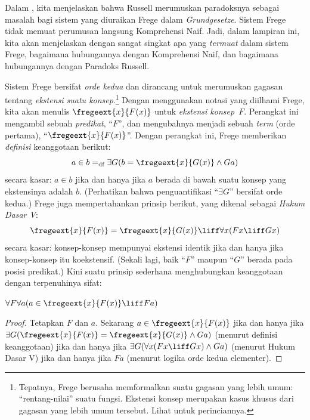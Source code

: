 \documentclass[../../../include/open-logic-section]{subfiles}
\begin{document}


Dalam , kita menjelaskan bahwa Russell merumuskan
paradoksnya sebagai masalah bagi sistem yang diuraikan Frege dalam
\emph{Grundgesetze}. Sistem Frege tidak memuat perumusan langsung Komprehensi
Naif. Jadi, dalam lampiran ini, kita akan menjelaskan dengan sangat singkat
apa yang \emph{termuat} dalam sistem Frege, bagaimana hubungannya dengan
Komprehensi Naif, dan bagaimana hubungannya dengan Paradoks Russell.

Sistem Frege bersifat \emph{orde kedua} dan dirancang untuk merumuskan
gagasan tentang \emph{ekstensi suatu konsep}.\footnote{Tepatnya, Frege
berusaha memformalkan suatu gagasan yang lebih umum: ``rentang-nilai'' suatu
fungsi. Ekstensi konsep merupakan kasus khusus dari gagasan yang lebih umum
tersebut. Lihat \citet[pp.\ 8--9]{Heck2012} untuk perinciannya.} Dengan
menggunakan notasi yang diilhami Frege, kita akan menulis
$\fregeext{x}{F(x)}$ untuk \emph{ekstensi konsep~$F$}. Perangkat ini mengambil
sebuah \emph{predikat}, ``$F$'', dan mengubahnya menjadi sebuah
\emph{term} (orde pertama), ``$\fregeext{x}{F(x)}$''. Dengan perangkat ini,
Frege memberikan \emph{definisi} keanggotaan berikut:
\[
	a \in b =_\text{df} \exists G(b = \fregeext{x}{G(x)} \land Ga)
\]
secara kasar: $a \in b$ jika dan hanya jika $a$ berada di bawah suatu konsep
yang ekstensinya adalah $b$. (Perhatikan bahwa penguantifikasi ``$\exists G$'' bersifat orde
kedua.) Frege juga mempertahankan prinsip berikut, yang dikenal sebagai
\emph{Hukum Dasar V}:
$$\fregeext{x}{F(x)} = \fregeext{x}{G(x)} \liff \forall x (Fx \liff Gx)$$
secara kasar: konsep-konsep mempunyai ekstensi identik jika dan hanya jika
konsep-konsep itu koekstensif. (Sekali lagi, baik ``$F$'' maupun ``$G$'' berada pada posisi
predikat.) Kini suatu prinsip sederhana menghubungkan keanggotaan dengan
terpenuhinya sifat:

\begin{lem}
$\forall F \forall a(a \in \fregeext{x}{F(x)} \liff Fa)$
\end{lem}

\begin{proof}
Tetapkan $F$ dan $a$. Sekarang $a \in \fregeext{x}{F(x)}$ jika dan hanya jika
$\exists G(\fregeext{x}{F(x)} = \fregeext{x}{G(x)} \land Ga)$ (menurut
definisi keanggotaan) jika dan hanya jika
$\exists G(\forall x(Fx \liff Gx) \land Ga)$ (menurut Hukum Dasar V) jika
dan hanya jika
$Fa$ (menurut logika orde kedua elementer).
\end{proof}
\end{document}
